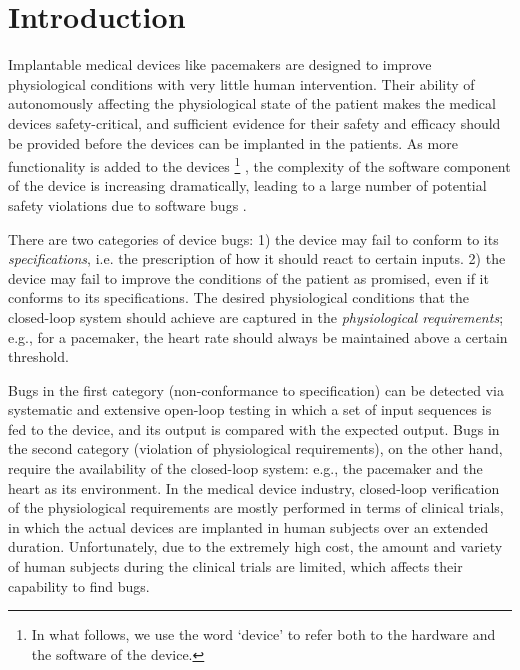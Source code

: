 \section{Introduction}
\label{introduction}

Implantable medical devices like pacemakers are designed to improve physiological conditions with very little human intervention. 
Their ability of autonomously affecting the physiological state of the patient makes the medical devices safety-critical, and sufficient evidence for their safety and efficacy should be provided before the devices can be implanted in the patients. 
As more functionality is added to the devices
\footnote{In what follows, we use the word `device' to refer both to the hardware and the software of the device.}
, the complexity of the software component of the device is increasing dramatically, leading to a large number of potential safety violations due to software bugs \cite{recall_stats}.



There are two categories of device bugs: 
1) the device may fail to conform to its \emph{specifications}, i.e. the prescription of how it should react to certain inputs.  
2) the device may fail to improve the conditions of the patient as promised, even if it conforms to its specifications. 
The desired physiological conditions that the closed-loop system should achieve are captured in the \emph{physiological requirements}; e.g., for a pacemaker, the heart rate should always be maintained above a certain threshold. 

Bugs in the first category (non-conformance to specification) can be detected via systematic and extensive open-loop testing in which a set of input sequences is fed to the device, and its output is compared with the expected output.
Bugs in the second category (violation of physiological requirements), on the other hand, require the availability of the closed-loop system: e.g., the pacemaker and the heart as its environment. 
In the medical device industry, closed-loop verification of the physiological requirements are mostly performed in terms of clinical trials, in which the actual devices are implanted in human subjects over an extended duration.
Unfortunately, due to the extremely high cost, the amount and variety of human subjects during the clinical trials are limited, which affects their capability to find bugs. 

